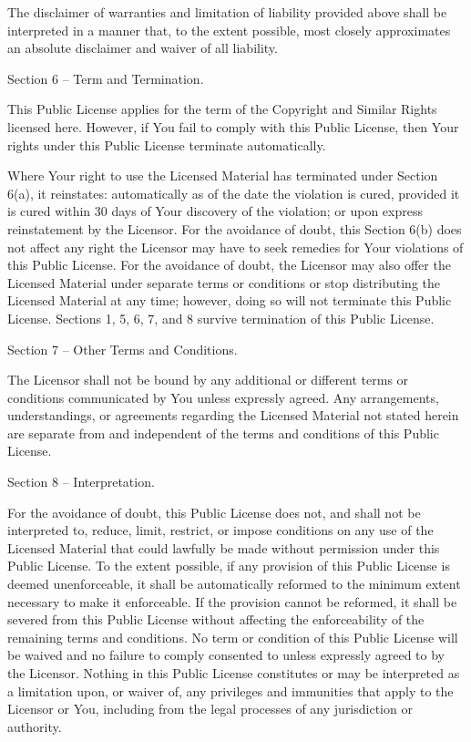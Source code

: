{    The disclaimer of warranties and limitation of liability provided above shall be interpreted in a manner that, to the extent possible, most closely approximates an absolute disclaimer and waiver of all liability.

Section 6 – Term and Termination.

    This Public License applies for the term of the Copyright and Similar Rights licensed here. However, if You fail to comply with this Public License, then Your rights under this Public License terminate automatically.

    Where Your right to use the Licensed Material has terminated under Section 6(a), it reinstates:
        automatically as of the date the violation is cured, provided it is cured within 30 days of Your discovery of the violation; or
        upon express reinstatement by the Licensor.
    For the avoidance of doubt, this Section 6(b) does not affect any right the Licensor may have to seek remedies for Your violations of this Public License.
    For the avoidance of doubt, the Licensor may also offer the Licensed Material under separate terms or conditions or stop distributing the Licensed Material at any time; however, doing so will not terminate this Public License.
    Sections 1, 5, 6, 7, and 8 survive termination of this Public License.

Section 7 – Other Terms and Conditions.

    The Licensor shall not be bound by any additional or different terms or conditions communicated by You unless expressly agreed.
    Any arrangements, understandings, or agreements regarding the Licensed Material not stated herein are separate from and independent of the terms and conditions of this Public License.

Section 8 – Interpretation.

    For the avoidance of doubt, this Public License does not, and shall not be interpreted to, reduce, limit, restrict, or impose conditions on any use of the Licensed Material that could lawfully be made without permission under this Public License.
    To the extent possible, if any provision of this Public License is deemed unenforceable, it shall be automatically reformed to the minimum extent necessary to make it enforceable. If the provision cannot be reformed, it shall be severed from this Public License without affecting the enforceability of the remaining terms and conditions.
    No term or condition of this Public License will be waived and no failure to comply consented to unless expressly agreed to by the Licensor.
    Nothing in this Public License constitutes or may be interpreted as a limitation upon, or waiver of, any privileges and immunities that apply to the Licensor or You, including from the legal processes of any jurisdiction or authority.

}
